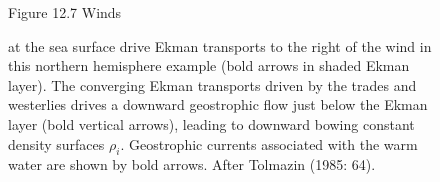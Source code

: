\begin{figure}[t]
\footnotesize
Figure 12.7 Winds \rule{0pt}{5ex} at the sea surface drive Ekman
transports to the right of the wind in this
northern hemisphere example (bold arrows in shaded Ekman layer). The
converging Ekman transports driven by the trades and westerlies drives
a downward geostrophic flow just below the Ekman layer (bold vertical
arrows), leading to downward bowing constant density surfaces
$\rho_i$. Geostrophic currents associated with the warm water are
shown by bold arrows. After Tolmazin (1985: 64).
\label{fig:EkmanPumping}
\vspace{-4ex}
\end{figure}

